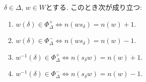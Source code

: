 \begin{lemma}
  \label{lem:n:bruhat}
  $\delta\in\Delta$, $w\in W$とする.
  このとき次が成り立つ:
  \begin{enumerate}
  \item
    \label{item:buruhat:formula:1}
    $w(\delta)\in\Phi_\Delta^+ \iff n(ws_\delta)=n(w)+1$.
  \item
    \label{item:buruhat:formula:-1}
     $w(\delta)\in\Phi_\Delta^- \iff n(ws_\delta)=n(w)-1$.
  \item
    \label{item:buruhat:formula:r:1}
    $w^{-1}(\delta)\in\Phi_\Delta^+ \iff n(s_\delta w)=n(w)+1$.
  \item
    \label{item:buruhat:formula:r:-1}
    $w^{-1}(\delta)\in\Phi_\Delta^- \iff n(s_\delta w)=n(w)-1$.
  \end{enumerate}
\end{lemma}
